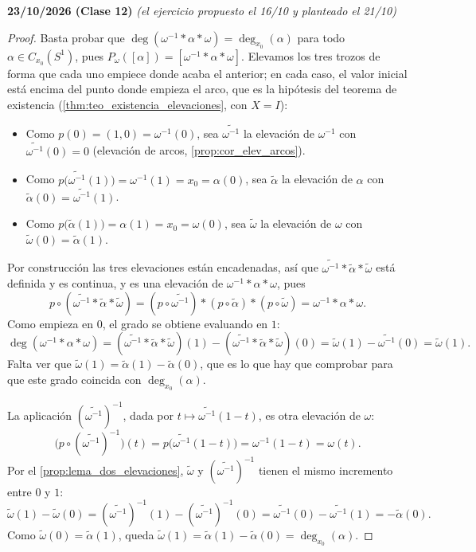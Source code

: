 \textbf{23/10/2026 (Clase 12)} \quad \textit{(el ejercicio propuesto el 16/10 y planteado el 21/10)}

\begin{proof}
Basta probar que $\deg(\omega^{-1} * \alpha * \omega) = \deg_{x_0}(\alpha)$ para todo $\alpha \in C_{x_0}(S^1)$, pues $P_\omega([\alpha]) = [\omega^{-1} * \alpha * \omega]$. Elevamos los tres trozos de forma que cada uno empiece donde acaba el anterior; en cada caso, el valor inicial está encima del punto donde empieza el arco, que es la hipótesis del teorema de existencia (\cref{thm:teo_existencia_elevaciones}, con $X = I$):
\begin{itemize}
    \item Como $p(0) = (1,0) = \omega^{-1}(0)$, sea $\widetilde{\omega^{-1}}$ la elevación de $\omega^{-1}$ con $\widetilde{\omega^{-1}}(0) = 0$ (elevación de arcos, \cref{prop:cor_elev_arcos}).
    \item Como $p\big(\widetilde{\omega^{-1}}(1)\big) = \omega^{-1}(1) = x_0 = \alpha(0)$, sea $\tilde{\alpha}$ la elevación de $\alpha$ con $\tilde{\alpha}(0) = \widetilde{\omega^{-1}}(1)$.
    \item Como $p\big(\tilde{\alpha}(1)\big) = \alpha(1) = x_0 = \omega(0)$, sea $\tilde{\omega}$ la elevación de $\omega$ con $\tilde{\omega}(0) = \tilde{\alpha}(1)$.
\end{itemize}
Por construcción las tres elevaciones están encadenadas, así que $\widetilde{\omega^{-1}} * \tilde{\alpha} * \tilde{\omega}$ está definida y es continua, y es una elevación de $\omega^{-1} * \alpha * \omega$, pues
\[ p \circ (\widetilde{\omega^{-1}} * \tilde{\alpha} * \tilde{\omega}) = (p \circ \widetilde{\omega^{-1}}) * (p \circ \tilde{\alpha}) * (p \circ \tilde{\omega}) = \omega^{-1} * \alpha * \omega. \]
Como empieza en $0$, el grado se obtiene evaluando en $1$:
\[ \deg(\omega^{-1} * \alpha * \omega) = (\widetilde{\omega^{-1}} * \tilde{\alpha} * \tilde{\omega})(1) - (\widetilde{\omega^{-1}} * \tilde{\alpha} * \tilde{\omega})(0) = \tilde{\omega}(1) - \widetilde{\omega^{-1}}(0) = \tilde{\omega}(1). \]
Falta ver que $\tilde{\omega}(1) = \tilde{\alpha}(1) - \tilde{\alpha}(0)$, que es lo que hay que comprobar para que este grado coincida con $\deg_{x_0}(\alpha)$.

La aplicación $(\widetilde{\omega^{-1}})^{-1}$, dada por $t \mapsto \widetilde{\omega^{-1}}(1-t)$, es otra elevación de $\omega$:
\[ \big(p \circ (\widetilde{\omega^{-1}})^{-1}\big)(t) = p\big(\widetilde{\omega^{-1}}(1-t)\big) = \omega^{-1}(1-t) = \omega(t). \]
Por el \cref{prop:lema_dos_elevaciones}, $\tilde{\omega}$ y $(\widetilde{\omega^{-1}})^{-1}$ tienen el mismo incremento entre $0$ y $1$:
\[ \tilde{\omega}(1) - \tilde{\omega}(0) = (\widetilde{\omega^{-1}})^{-1}(1) - (\widetilde{\omega^{-1}})^{-1}(0) = \widetilde{\omega^{-1}}(0) - \widetilde{\omega^{-1}}(1) = -\tilde{\alpha}(0). \]
Como $\tilde{\omega}(0) = \tilde{\alpha}(1)$, queda $\tilde{\omega}(1) = \tilde{\alpha}(1) - \tilde{\alpha}(0) = \deg_{x_0}(\alpha)$.
\end{proof}

